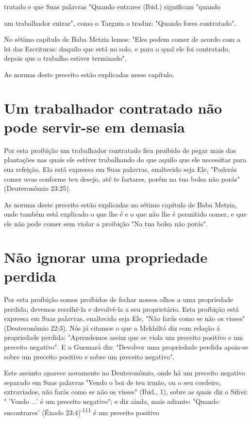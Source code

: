 \begin{itemize}
\begin{enumrate}
\begin{itemize}
\begin{itemize}
\begin{itemize}
tratado e que Suas palavras "Quando entrares (Ibid.) significam "quando

um trabalhador entrar", como o Targum o traduz: "Quando fores
contratado".

No sétimo capítulo de Baba Metzia lemos: "Eles podem comer de acordo com
a lei das Escrituras: daquilo que está no solo, e para o qual ele foi
contratado, depois que o trabalho estiver terminado".

As normas deste preceito estão explicadas nesse capítulo.

\section{Um trabalhador contratado não pode servir-se em demasia}

Por esta proibição um trabalhador contratado fica proibido de pe­gar
mais das plantações nas quais ele estiver trabalhando do que aquilo que
ele necessitar para sua refeição. Ela está expressa em Suas palavras,
enaltecido seja Ele, "Poderás comer uvas conforme teu desejo, até te
fartares, porém na tua bolsa não porás" (Deuteronômio 23:25).

As normas deste preceito estão explicadas no sétimo capítulo de Baba
Metzia, onde também está explicado o que lhe é e o que não lhe é
permitido comer, e que ele não pode comer sem violar a proibição "Na tua
bolsa não porás".

\section{Não ignorar uma propriedade perdida}

Por esta proibição somos proibidos de fechar nossos olhos a uma
propriedade perdida; devemos recolhê-la e devolvê-la a seu proprietário.
Esta proibição está expressa em Suas palavras, enaltecido seja Ele, "Não
farás co­mo se não os visses" (Deuteronômio 22:3). Nós já citamos o que
a Mekhiltá diz com relação à propriedade perdida: "Aprendemos assim que
se viola um preceito positivo e um preceito negativo". E a Guemará diz:
"Devolver uma propriedade perdida apoia-se sobre um preceito positivo e
sobre um preceito negativo".

Este assunto aparece novamente no Deuteronômio, onde há um pre­ceito
negativo separado em Suas palavras "Vendo o boi de teu irmão, ou o seu
cordeiro, extraviados, não farás como se não os visses" (Ibid., 1),
sobre as quais diz o Sifrei: " 'Vendo ...' é um preceito negativo"; e
diz ainda, mais adiante: "Quando encontrares' (Êxodo
23:4)\textsuperscript{-111} é um preceito positivo


\end{itemize}
\end{itemize}
\end{itemize}
\end{enumrate}
\end{itemize}
